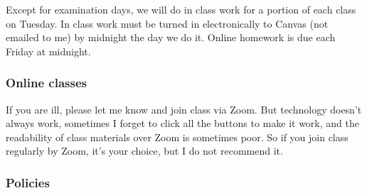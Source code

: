 \documentclass[12pt]{article}
\newcounter{ex}\setcounter{ex}{0}
\begin{document}
Except for examination days, we will do in class work for a portion 
of each class on Tuesday. In class work must be turned in 
electronically to Canvas (not emailed to me) by midnight the day we 
do it. Online homework is due each Friday at midnight. 

\subsubsection*{Online classes}

If you are ill, please let me know and join class via Zoom. But technology doesn't 
always work, sometimes I forget to click all the buttons to make it work,
and the readability of class materials over Zoom is sometimes poor. So if you 
join class regularly by Zoom, it's your choice, but I do not recommend it. 

\subsubsection* {Policies}
\end{document}
